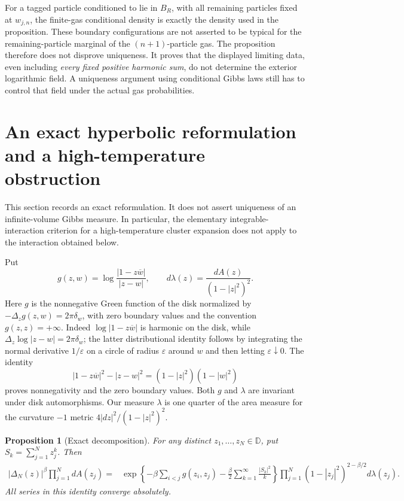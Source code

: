 \documentclass[11pt,a4paper]{article}
\numberwithin{equation}{section}
\newtheorem{proposition}[theorem]{Proposition}
\theoremstyle{definition}
\theoremstyle{remark}
\begin{document}
For a tagged particle conditioned to lie in $B_R$, with all remaining
particles fixed at $w_{j,n}$, the finite-gas conditional density is exactly
the density used in the proposition. These boundary configurations are
not asserted to be typical for the remaining-particle marginal of the
$(n+1)$-particle gas. The proposition therefore does not disprove
uniqueness. It proves that the displayed limiting data, even including
\emph{every fixed positive harmonic sum}, do not determine the exterior
logarithmic field. A uniqueness argument using conditional Gibbs laws
still has to control that field under the actual gas probabilities.


\section{An exact hyperbolic reformulation and a high-temperature obstruction}
\label{sec:hyperbolic-reduction}

This section records an exact reformulation.  It does not assert uniqueness
of an infinite-volume Gibbs measure.  In particular, the elementary
integrable-interaction criterion for a high-temperature cluster expansion
does not apply to the interaction obtained below.

Put
\[
 g(z,w)=\log\frac{|1-z\overline w|}{|z-w|},\qquad
 d\lambda(z)=\frac{dA(z)}{(1-|z|^2)^2}.
\]
Here $g$ is the nonnegative Green function of the disk normalized by
$-\Delta_z g(z,w)=2\pi\delta_w$, with zero boundary values and the
convention $g(z,z)=+\infty$.  Indeed $\log|1-z\overline w|$ is harmonic
on the disk, while $\Delta_z\log|z-w|=2\pi\delta_w$; the latter
distributional identity follows by integrating the normal derivative
$1/\varepsilon$ on a circle of radius $\varepsilon$ around $w$ and then
letting $\varepsilon\downarrow0$.  The identity
\[
 |1-z\overline w|^2-|z-w|^2=(1-|z|^2)(1-|w|^2)
\]
proves nonnegativity and the zero boundary values.  Both $g$ and
$\lambda$ are invariant under disk automorphisms.  Our measure $\lambda$
is one quarter of the area measure for the curvature $-1$ metric
$4|dz|^2/(1-|z|^2)^2$.

\begin{proposition}[Exact decomposition]\label{prop:hyperbolic-exact}
For any distinct $z_1,\ldots,z_N\in\mathbb D$, put
$S_k=\sum_{j=1}^N z_j^k$.  Then
\begin{align}
 |\Delta_N(z)|^\beta\prod_{j=1}^N dA(z_j)
 ={}&\exp\left\{-\beta\sum_{i<j}g(z_i,z_j)
       -\frac\beta2\sum_{k=1}^{\infty}\frac{|S_k|^2}{k}\right\}
 \prod_{j=1}^N(1-|z_j|^2)^{2-\beta/2}d\lambda(z_j).
 \label{eq:hyperbolic-exact}
\end{align}
All series in this identity converge absolutely.
\end{proposition}
\end{document}
